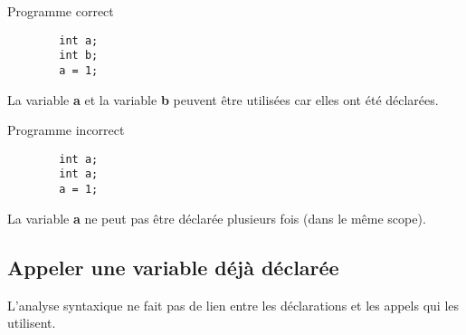 \documentclass{../../res/univ-projet}
\begin{document}
      \begin{multicols}{2}
        {\color{success} Programme correct}\\

        \begin{verbatim}
        int a;
        int b;
        a = 1;

        \end{verbatim}

        {\color{success} La variable {\bfseries a} et la variable {\bfseries b} peuvent être utilisées car elles ont été déclarées.}

      \columnbreak

        {\color{danger} Programme incorrect}\\

        \begin{verbatim}
        int a;
        int a;
        a = 1;
        \end{verbatim}

        {\color{danger} La variable {\bfseries a} ne peut pas être déclarée plusieurs fois (dans le même scope).}
      \end{multicols}

    \subsection{Appeler une variable déjà déclarée}
      L'analyse syntaxique ne fait pas de lien entre les déclarations et les appels qui les utilisent.\\
      
\end{document}
